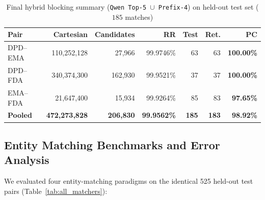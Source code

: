 \documentclass{llncs}
\begin{document}
\begin{table}[htbp]
\centering
\caption{Final hybrid blocking summary (\texttt{Qwen Top-5 $\cup$ Prefix-4}) on held-out test set ($185$ matches)}
\label{tab:blocking_candidates}
\scriptsize
\setlength{\tabcolsep}{2.5pt}
\begin{tabular}{|l|r|r|r|r|r|r|}
\hline
\textbf{Pair} & \textbf{Cartesian} & \textbf{Candidates} & \textbf{RR} & \textbf{Test} & \textbf{Ret.} & \textbf{PC} \\
\hline
DPD--EMA & 110,252,128 &  27,966 & 99.9746\% & 63 & 63 & \textbf{100.00\%} \\
DPD--FDA & 340,374,300 & 162,930 & 99.9521\% & 37 & 37 & \textbf{100.00\%} \\
EMA--FDA &  21,647,400 &  15,934 & 99.9264\% & 85 & 83 &  \textbf{97.65\%} \\
\hline
\textbf{Pooled} & \textbf{472,273,828} & \textbf{206,830} & \textbf{99.9562\%} & \textbf{185} & \textbf{183} & \textbf{98.92\%} \\
\hline
\end{tabular}
\end{table}

\subsection{Entity Matching Benchmarks and Error Analysis}

We evaluated four entity-matching paradigms on the identical 525 held-out test pairs (Table~\ref{tab:all_matchers}):
\end{document}
